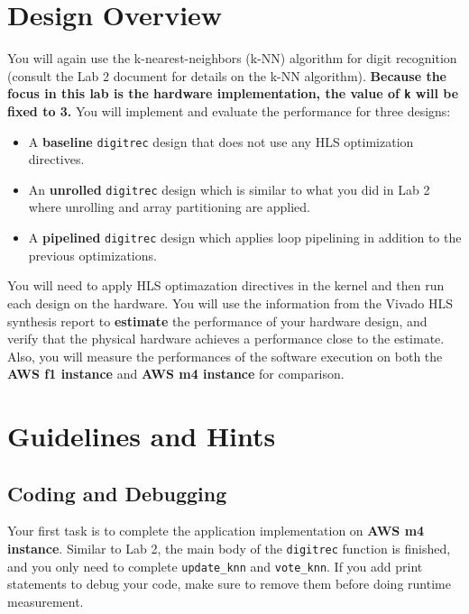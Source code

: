 \documentclass[paper=letter, fontsize=11.6pt]{scrartcl} %
\numberwithin{equation}{section} %
\numberwithin{figure}{section} %
\numberwithin{table}{section} %
\begin{document}

\section{Design Overview}
You will again use the k-nearest-neighbors (k-NN) algorithm for digit recognition
(consult the Lab 2 document for details on the k-NN algorithm).
\textbf{Because the focus in this lab is the hardware implementation, the value of \texttt{k} will be fixed to 3.}
You will implement and evaluate the performance for three designs:
\begin{itemize}
  \item A \textbf{baseline} \texttt{digitrec} design that does not use any HLS optimization directives. 
  \item An \textbf{unrolled} \texttt{digitrec} design which is similar to what you did in Lab 2 where unrolling and array partitioning are applied.
  \item A \textbf{pipelined} \texttt{digitrec} design which applies loop pipelining in addition to the previous optimizations.
\end{itemize}
You will need to apply HLS optimazation directives in the kernel and then run each design on the hardware.
You will use the information from the Vivado HLS synthesis report
to \textbf{estimate} the performance of your hardware design, and verify that the
physical hardware achieves a performance close to the estimate.
Also, you will measure the performances of the software execution 
on both the \textbf{AWS f1 instance} and \textbf{AWS m4 instance} for comparison.

\section{Guidelines and Hints}
\subsection{Coding and Debugging}
Your first task is to complete the application implementation
on \textbf{AWS m4 instance}. Similar to Lab 2, the main body of the \texttt{digitrec} function is finished,
and you only need to complete \texttt{update\_knn} and \texttt{vote\_knn}.  
If you add print statements to debug your code, make sure to remove them before
doing runtime measurement.
\end{document}
